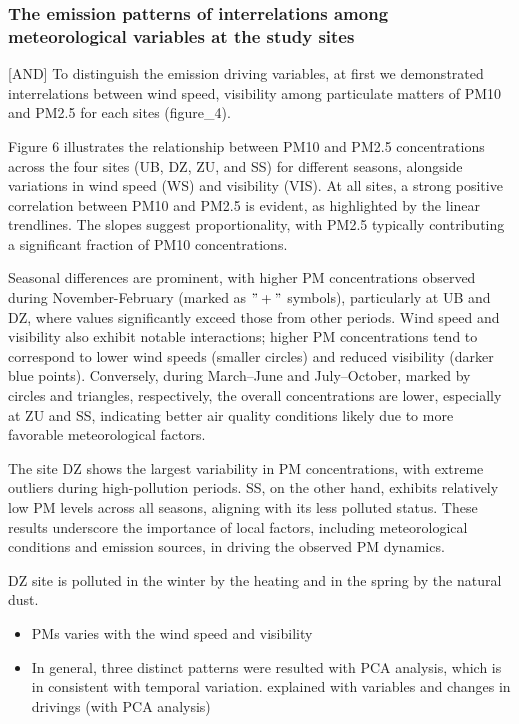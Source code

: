 \documentclass[
  11pt,
]{article}
\providecommand{\tightlist}{%
  \setlength{\itemsep}{0pt}\setlength{\parskip}{0pt}}
\begin{document}
\subsubsection{The emission patterns of interrelations among
meteorological variables at the study
sites}\label{the-emission-patterns-of-interrelations-among-meteorological-variables-at-the-study-sites}

{[}AND{]} To distinguish the emission driving variables, at first we
demonstrated interrelations between wind speed, visibility among
particulate matters of PM10 and PM2.5 for each sites (figure\_4).

Figure 6 illustrates the relationship between PM10 and PM2.5
concentrations across the four sites (UB, DZ, ZU, and SS) for different
seasons, alongside variations in wind speed (WS) and visibility (VIS).
At all sites, a strong positive correlation between PM10 and PM2.5 is
evident, as highlighted by the linear trendlines. The slopes suggest
proportionality, with PM2.5 typically contributing a significant
fraction of PM10 concentrations.

Seasonal differences are prominent, with higher PM concentrations
observed during November-February (marked as \("+"\) symbols),
particularly at UB and DZ, where values significantly exceed those from
other periods. Wind speed and visibility also exhibit notable
interactions; higher PM concentrations tend to correspond to lower wind
speeds (smaller circles) and reduced visibility (darker blue points).
Conversely, during March--June and July--October, marked by circles and
triangles, respectively, the overall concentrations are lower,
especially at ZU and SS, indicating better air quality conditions likely
due to more favorable meteorological factors.

The site DZ shows the largest variability in PM concentrations, with
extreme outliers during high-pollution periods. SS, on the other hand,
exhibits relatively low PM levels across all seasons, aligning with its
less polluted status. These results underscore the importance of local
factors, including meteorological conditions and emission sources, in
driving the observed PM dynamics.

DZ site is polluted in the winter by the heating and in the spring by
the natural dust.

\begin{itemize}
\tightlist
\item
  PMs varies with the wind speed and visibility
\item
  In general, three distinct patterns were resulted with PCA analysis,
  which is in consistent with temporal variation. explained with
  variables and changes in drivings (with PCA analysis)
\end{itemize}
\end{document}
